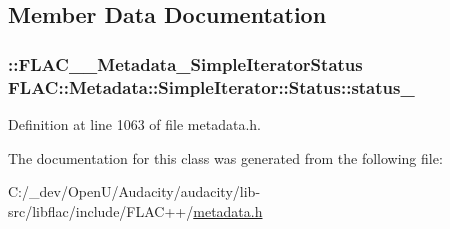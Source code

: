 \subsection{Member Data Documentation}
\subsubsection[{\texorpdfstring{status\+\_\+}{status_}}]{\setlength{\rightskip}{0pt plus 5cm}\+::{\bf F\+L\+A\+C\+\_\+\+\_\+\+Metadata\+\_\+\+Simple\+Iterator\+Status} F\+L\+A\+C\+::\+Metadata\+::\+Simple\+Iterator\+::\+Status\+::status\+\_\+\hspace{0.3cm}{\ttfamily [protected]}}\hypertarget{class_f_l_a_c_1_1_metadata_1_1_simple_iterator_1_1_status_a4e60c55f551cfdfed02c1d4d1ceb23bf}{}\label{class_f_l_a_c_1_1_metadata_1_1_simple_iterator_1_1_status_a4e60c55f551cfdfed02c1d4d1ceb23bf}


Definition at line 1063 of file metadata.\+h.



The documentation for this class was generated from the following file\+:\begin{DoxyCompactItemize}
\item 
C\+:/\+\_\+dev/\+Open\+U/\+Audacity/audacity/lib-\/src/libflac/include/\+F\+L\+A\+C++/\hyperlink{include_2_f_l_a_c_09_09_2metadata_8h}{metadata.\+h}\end{DoxyCompactItemize}
